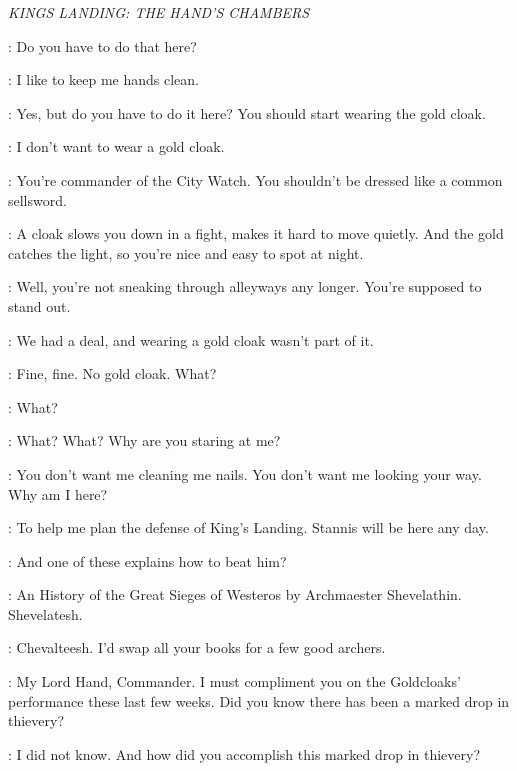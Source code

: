 \scene

\textit{KINGS LANDING: THE HAND'S CHAMBERS} 


\TYRION: Do you have to do that here? 

\BRONN: I like to keep me hands clean. 

\TYRION: Yes, but do you have to do it here? You should start wearing the gold cloak. 

\BRONN: I don't want to wear a gold cloak. 

\TYRION: You're commander of the City Watch. You shouldn't be dressed like a common sellsword. 

\BRONN: A cloak slows you down in a fight, makes it hard to move quietly. And the gold catches the light, so you're nice and easy to spot at night. 

\TYRION: Well, you're not sneaking through alleyways any longer. You're supposed to stand out. 

\BRONN: We had a deal, and wearing a gold cloak wasn't part of it.


\TYRION: Fine, fine. No gold cloak. What? 

\BRONN: What? 

\TYRION: What? What? Why are you staring at me? 

\BRONN: You don't want me cleaning me nails. You don't want me looking your way. Why am I here? 

\TYRION: To help me plan the defense of King's Landing. Stannis will be here any day. 

\BRONN: And one of these  explains how to beat him? 

\TYRION: An History of the Great Sieges of Westeros by Archmaester Shevelathin. Shevelatesh. 

\BRONN: Chevalteesh. I'd swap all your books for a few good archers.


\VARYS: My Lord Hand, Commander. I must compliment you on the Goldcloaks' performance these last few weeks. Did you know there has been a marked drop in thievery? 

\TYRION: I did not know. And how did you accomplish this marked drop in thievery? 

